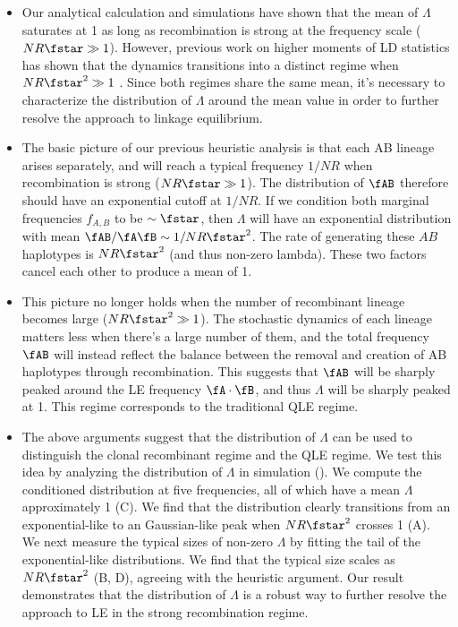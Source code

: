 \documentclass[aps,rmp,twocolumn,groupedaddress,floatfix,notitlepage]{revtex4-1}
\begin{document}
\begin{itemize}
    \item Our analytical calculation and simulations have shown that the mean of $\Lambda$ saturates at 1 as long as recombination is strong at the frequency scale ($NR\fstar\gg1$). However, previous work on higher moments of LD statistics has shown that the dynamics transitions into a distinct regime when $NR\fstar^2\gg1$ \parencite{good_2022}. Since both regimes share the same mean, it's necessary to characterize the distribution of $\Lambda$ around the mean value in order to further resolve the approach to linkage equilibrium.
	\item The basic picture of our previous heuristic analysis is that each AB lineage arises separately, and will reach a typical frequency $1/NR$ when recombination is strong ($NR\fstar\gg1$). The distribution of $\fAB$ therefore should have an exponential cutoff at $1/NR$. If we condition both marginal frequencies $f_{A, B}$ to be $\sim \fstar$, then $\Lambda$ will have an exponential distribution with mean $\fAB / \fA\fB \sim 1/NR\fstar^2$. The rate of generating these $AB$ haplotypes is $NR\fstar^2$ (and thus non-zero lambda). These two factors cancel each other to produce a mean of 1.
	\item This picture no longer holds when the number of recombinant lineage becomes large ($NR\fstar^2\gg1$). The stochastic dynamics of each lineage matters less when there's a large number of them, and the total frequency $\fAB$ will instead reflect the balance between the removal and creation of AB haplotypes through recombination. This suggests that $\fAB$ will be sharply peaked around the LE frequency $\fA\cdot\fB$, and thus $\Lambda$ will be sharply peaked at 1. This regime corresponds to the traditional QLE regime.
    \item The above arguments suggest that the distribution of $\Lambda$ can be used to distinguish the clonal recombinant regime and the QLE regime. We test this idea by analyzing the distribution of $\Lambda$ in simulation (). We compute the conditioned distribution at five frequencies, all of which have a mean $\Lambda$ approximately 1 (C). We find that the distribution clearly transitions from an exponential-like to an Gaussian-like peak when $NR\fstar^2$ crosses 1 (A). We next measure the typical sizes of non-zero $\Lambda$ by fitting the tail of the exponential-like distributions. We find that the typical size scales as $NR\fstar^2$ (B, D), agreeing with the heuristic argument. Our result demonstrates that the distribution of $\Lambda$ is a robust way to further resolve the approach to LE in the strong recombination regime.
\end{itemize}
\end{document}
